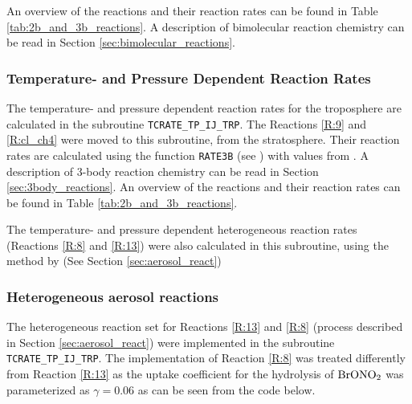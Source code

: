 \medskip

An overview of the reactions and their reaction rates can be found in Table \ref{tab:2b_and_3b_reactions}. A description of bimolecular reaction chemistry can be read in Section \ref{sec:bimolecular_reactions}. 

\subsubsection{Temperature- and Pressure Dependent Reaction Rates}\label{sec:temp_press_dependent_react_rates}

The temperature- and pressure dependent reaction rates for the troposphere are calculated in the subroutine \texttt{TCRATE\_TP\_IJ\_TRP}. The Reactions \ref{R:9} and \ref{R:cl_ch4} were moved to this subroutine, from the stratosphere. Their reaction rates are calculated using the function \texttt{RATE3B} (see \cite{SovdeManual}) with values from \cite{JPL}. A description of 3-body reaction chemistry can be read in Section \ref{sec:3body_reactions}. An overview of the reactions and their reaction rates can be found in Table \ref{tab:2b_and_3b_reactions}. 

\medskip

The temperature- and pressure dependent heterogeneous reaction rates (Reactions \ref{R:8} and \ref{R:13}) were also calculated in this subroutine, using the method by \cite{CAO} (See Section \ref{sec:aerosol_react})

\subsubsection{Heterogeneous aerosol reactions}\label{sec:het_aerosol_react_CTM3}

The heterogeneous reaction set for Reactions \ref{R:13} and \ref{R:8} (process described in Section \ref{sec:aerosol_react}) were implemented in the subroutine \texttt{TCRATE\_TP\_IJ\_TRP}. The implementation of Reaction \ref{R:8} was treated differently from Reaction \ref{R:13} as the uptake coefficient for the hydrolysis of $\mathrm{BrONO_2}$ was parameterized as $\gamma = 0.06$ as can be seen from the code below. 


